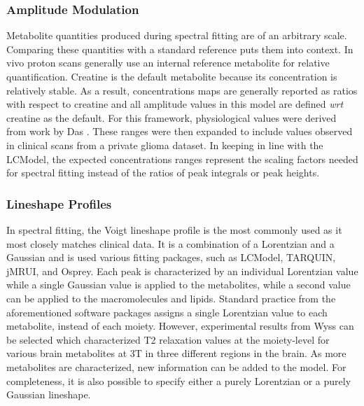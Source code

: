 \subsubsection{Amplitude Modulation}
Metabolite quantities produced during spectral fitting are of an arbitrary scale. Comparing these quantities with a standard reference puts them into context. In vivo proton scans generally use an internal reference metabolite for relative quantification. Creatine is the default metabolite because its concentration is relatively stable. As a result, concentrations maps are generally reported as ratios with respect to creatine and all amplitude values in this model are defined \textit{wrt} creatine as the default. For this framework, physiological values were derived from work by Das \etal\cite{Das2017,Das2018}. These ranges were then expanded to include values observed in clinical scans from a private glioma dataset. In keeping in line with the LCModel, the expected concentrations ranges represent the scaling factors needed for spectral fitting instead of the ratios of peak integrals or peak heights.
 
\subsubsection{Lineshape Profiles}
In spectral fitting, the Voigt lineshape profile is the most commonly used as it most closely matches clinical data. It is a combination of a Lorentzian and a Gaussian and is used various fitting packages, such as LCModel\cite{Provencher2001}, TARQUIN\cite{Wilson2011}, jMRUI\cite{Stefan2009}, and Osprey\cite{Oeltzschner2020}. Each peak is characterized by an individual Lorentzian value while a single Gaussian value is applied to the metabolites, while a second value can be applied to the macromolecules and lipids. Standard practice from the aforementioned software packages assigns a single Lorentzian value to each metabolite, instead of each moiety. However, experimental results from Wyss \etal\cite{Wyss2018} can be selected which characterized T2 relaxation values at the moiety-level for various brain metabolites at 3T in three different regions in the brain. As more metabolites are characterized, new information can be added to the model. For completeness, it is also possible to specify either a purely Lorentzian or a purely Gaussian lineshape.
 
